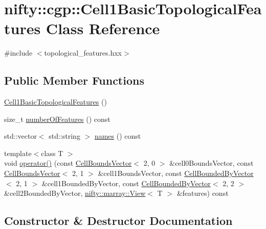 \hypertarget{classnifty_1_1cgp_1_1Cell1BasicTopologicalFeatures}{}\section{nifty\+:\+:cgp\+:\+:Cell1\+Basic\+Topological\+Features Class Reference}
\label{classnifty_1_1cgp_1_1Cell1BasicTopologicalFeatures}


{\ttfamily \#include $<$topological\+\_\+features.\+hxx$>$}

\subsection*{Public Member Functions}
\begin{DoxyCompactItemize}
\item 
\hyperlink{classnifty_1_1cgp_1_1Cell1BasicTopologicalFeatures_acf309275f4b84d463dee9bea89cd5108}{Cell1\+Basic\+Topological\+Features} ()
\item 
size\+\_\+t \hyperlink{classnifty_1_1cgp_1_1Cell1BasicTopologicalFeatures_a56a29c126efbbd38b10dce2b5ba387cb}{number\+Of\+Features} () const 
\item 
std\+::vector$<$ std\+::string $>$ \hyperlink{classnifty_1_1cgp_1_1Cell1BasicTopologicalFeatures_a84002abd81f8620a17caa3b472b6d87b}{names} () const 
\item 
{\footnotesize template$<$class T $>$ }\\void \hyperlink{classnifty_1_1cgp_1_1Cell1BasicTopologicalFeatures_a1a4258f15fc13907751006b6aae69342}{operator()} (const \hyperlink{classnifty_1_1cgp_1_1CellBoundsVector}{Cell\+Bounds\+Vector}$<$ 2, 0 $>$ \&cell0\+Bounds\+Vector, const \hyperlink{classnifty_1_1cgp_1_1CellBoundsVector}{Cell\+Bounds\+Vector}$<$ 2, 1 $>$ \&cell1\+Bounds\+Vector, const \hyperlink{classnifty_1_1cgp_1_1CellBoundedByVector}{Cell\+Bounded\+By\+Vector}$<$ 2, 1 $>$ \&cell1\+Bounded\+By\+Vector, const \hyperlink{classnifty_1_1cgp_1_1CellBoundedByVector}{Cell\+Bounded\+By\+Vector}$<$ 2, 2 $>$ \&cell2\+Bounded\+By\+Vector, \hyperlink{classandres_1_1View}{nifty\+::marray\+::\+View}$<$ T $>$ \&features) const 
\end{DoxyCompactItemize}


\subsection{Constructor \& Destructor Documentation}
\hypertarget{classnifty_1_1cgp_1_1Cell1BasicTopologicalFeatures_acf309275f4b84d463dee9bea89cd5108}{}
